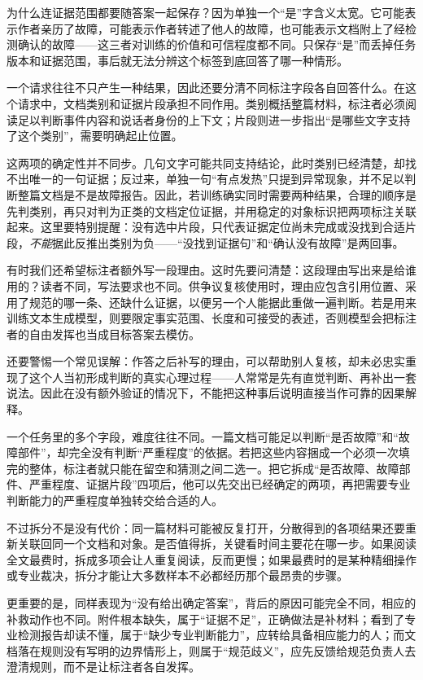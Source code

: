 为什么连证据范围都要随答案一起保存？因为单独一个“是”字含义太宽。它可能表示作者亲历了故障，可能表示作者转述了他人的故障，也可能表示文档附上了经检测确认的故障——这三者对训练的价值和可信程度都不同。只保存“是”而丢掉任务版本和证据范围，事后就无法分辨这个标签到底回答了哪一种情形。

一个请求往往不只产生一种结果，因此还要分清不同标注字段各自回答什么。在这个请求中，文档类别和证据片段承担不同作用。类别概括整篇材料，标注者必须阅读足以判断事件内容和说话者身份的上下文；片段则进一步指出“是哪些文字支持了这个类别”，需要明确起止位置。

这两项的确定性并不同步。几句文字可能共同支持结论，此时类别已经清楚，却找不出唯一的一句证据；反过来，单独一句“有点发热”只提到异常现象，并不足以判断整篇文档是不是故障报告。因此，若训练确实同时需要两种结果，合理的顺序是先判类别，再只对判为正类的文档定位证据，并用稳定的对象标识把两项标注关联起来。这里要特别提醒：没有选中片段，只代表证据定位尚未完成或没找到合适片段，\emph{不能}据此反推出类别为负——“没找到证据句”和“确认没有故障”是两回事。

有时我们还希望标注者额外写一段理由。这时先要问清楚：这段理由写出来是给谁用的？读者不同，写法要求也不同。供争议复核使用时，理由应包含引用位置、采用了规范的哪一条、还缺什么证据，以便另一个人能据此重做一遍判断。若是用来训练文本生成模型，则要限定事实范围、长度和可接受的表述，否则模型会把标注者的自由发挥也当成目标答案去模仿。

还要警惕一个常见误解：作答之后补写的理由，可以帮助别人复核，却未必忠实重现了这个人当初形成判断的真实心理过程——人常常是先有直觉判断、再补出一套说法。因此在没有额外验证的情况下，不能把这种事后说明直接当作可靠的因果解释。

一个任务里的多个字段，难度往往不同。一篇文档可能足以判断“是否故障”和“故障部件”，却完全没有判断“严重程度”的依据。若把这些内容捆成一个必须一次填完的整体，标注者就只能在留空和猜测之间二选一。把它拆成“是否故障、故障部件、严重程度、证据片段”四项后，他可以先交出已经确定的两项，再把需要专业判断能力的严重程度单独转交给合适的人。

不过拆分不是没有代价：同一篇材料可能被反复打开，分散得到的各项结果还要重新关联回同一个文档和对象。是否值得拆，关键看时间主要花在哪一步。如果阅读全文最费时，拆成多项会让人重复阅读，反而更慢；如果最费时的是某种精细操作或专业裁决，拆分才能让大多数样本不必都经历那个最昂贵的步骤。

更重要的是，同样表现为“没有给出确定答案”，背后的原因可能完全不同，相应的补救动作也不同。附件根本缺失，属于“证据不足”，正确做法是补材料；看到了专业检测报告却读不懂，属于“缺少专业判断能力”，应转给具备相应能力的人；而文档落在规则没有写明的边界情形上，则属于“规范歧义”，应先反馈给规范负责人去澄清规则，而不是让标注者各自发挥。

